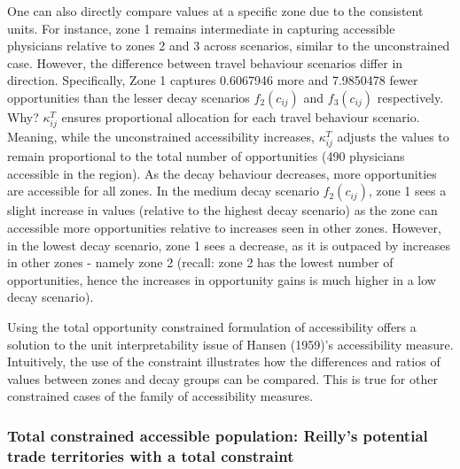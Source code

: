 \documentclass[
]{article}
\begin{document}
One can also directly compare values at a specific zone due to the
consistent units. For instance, zone 1 remains intermediate in capturing
accessible physicians relative to zones 2 and 3 across scenarios,
similar to the unconstrained case. However, the difference between
travel behaviour scenarios differ in direction. Specifically, Zone 1
captures 0.6067946 more and 7.9850478 fewer opportunities than the
lesser decay scenarios \(f_2(c_{ij})\) and \(f_3(c_{ij})\) respectively.
Why? \(\kappa_{ij}^T\) ensures proportional allocation for each travel
behaviour scenario. Meaning, while the unconstrained accessibility
increases, \(\kappa_{ij}^T\) adjusts the values to remain proportional
to the total number of opportunities (490 physicians accessible in the
region). As the decay behaviour decreases, more opportunities are
accessible for all zones. In the medium decay scenario \(f_2(c_{ij})\),
zone 1 sees a slight increase in values (relative to the highest decay
scenario) as the zone can accessible more opportunities relative to
increases seen in other zones. However, in the lowest decay scenario,
zone 1 sees a decrease, as it is outpaced by increases in other zones -
namely zone 2 (recall: zone 2 has the lowest number of opportunities,
hence the increases in opportunity gains is much higher in a low decay
scenario).

Using the total opportunity constrained formulation of accessibility
offers a solution to the unit interpretability issue of Hansen (1959)'s
accessibility measure. Intuitively, the use of the constraint
illustrates how the differences and ratios of values between zones and
decay groups can be compared. This is true for other constrained cases
of the family of accessibility measures.

\subsubsection{Total constrained accessible population: Reilly's
potential trade territories with a total
constraint}\label{total-constrained-accessible-population-reillys-potential-trade-territories-with-a-total-constraint}
\end{document}
